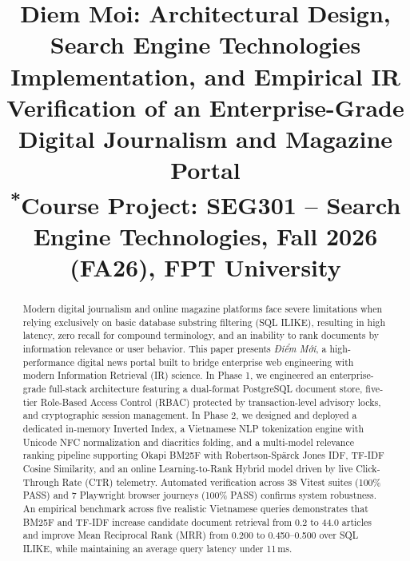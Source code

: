 \documentclass[conference]{IEEEtran}
\begin{document}
\title{Diem Moi: Architectural Design, Search Engine Technologies Implementation, and Empirical IR Verification of an Enterprise-Grade Digital Journalism and Magazine Portal\\
{\footnotesize \textsuperscript{*}Course Project: SEG301 -- Search Engine Technologies, Fall 2026 (FA26), FPT University}
}

\author{
\and
{}
}

\maketitle

\begin{abstract}
Modern digital journalism and online magazine platforms face severe limitations when relying exclusively on basic database substring filtering (SQL ILIKE), resulting in high latency, zero recall for compound terminology, and an inability to rank documents by information relevance or user behavior. This paper presents \textit{Điểm Mới}, a high-performance digital news portal built to bridge enterprise web engineering with modern Information Retrieval (IR) science. In Phase 1, we engineered an enterprise-grade full-stack architecture featuring a dual-format PostgreSQL document store, five-tier Role-Based Access Control (RBAC) protected by transaction-level advisory locks, and cryptographic session management. In Phase 2, we designed and deployed a dedicated in-memory Inverted Index, a Vietnamese NLP tokenization engine with Unicode NFC normalization and diacritics folding, and a multi-model relevance ranking pipeline supporting Okapi BM25F with Robertson-Spärck Jones IDF, TF-IDF Cosine Similarity, and an online Learning-to-Rank Hybrid model driven by live Click-Through Rate (CTR) telemetry. Automated verification across 38 Vitest suites (100\% PASS) and 7 Playwright browser journeys (100\% PASS) confirms system robustness. An empirical benchmark across five realistic Vietnamese queries demonstrates that BM25F and TF-IDF increase candidate document retrieval from 0.2 to 44.0 articles and improve Mean Reciprocal Rank (MRR) from 0.200 to 0.450--0.500 over SQL ILIKE, while maintaining an average query latency under 11\,ms.
\end{abstract}
\end{document}

